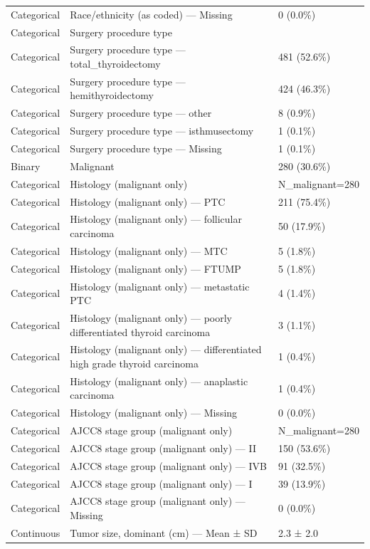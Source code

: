 \begin{table}[htbp]
\begin{tabular}{lll}
Categorical & Race/ethnicity (as coded) — Missing & 0 (0.0\%) \\
Categorical & Surgery procedure type &  \\
Categorical & Surgery procedure type — total\_thyroidectomy & 481 (52.6\%) \\
Categorical & Surgery procedure type — hemithyroidectomy & 424 (46.3\%) \\
Categorical & Surgery procedure type — other & 8 (0.9\%) \\
Categorical & Surgery procedure type — isthmusectomy & 1 (0.1\%) \\
Categorical & Surgery procedure type — Missing & 1 (0.1\%) \\
Binary & Malignant & 280 (30.6\%) \\
Categorical & Histology (malignant only) & N\_malignant=280 \\
Categorical & Histology (malignant only) — PTC & 211 (75.4\%) \\
Categorical & Histology (malignant only) — follicular carcinoma & 50 (17.9\%) \\
Categorical & Histology (malignant only) — MTC & 5 (1.8\%) \\
Categorical & Histology (malignant only) — FTUMP & 5 (1.8\%) \\
Categorical & Histology (malignant only) — metastatic PTC & 4 (1.4\%) \\
Categorical & Histology (malignant only) — poorly differentiated thyroid carcinoma & 3 (1.1\%) \\
Categorical & Histology (malignant only) — differentiated high grade thyroid carcinoma & 1 (0.4\%) \\
Categorical & Histology (malignant only) — anaplastic carcinoma & 1 (0.4\%) \\
Categorical & Histology (malignant only) — Missing & 0 (0.0\%) \\
Categorical & AJCC8 stage group (malignant only) & N\_malignant=280 \\
Categorical & AJCC8 stage group (malignant only) — II & 150 (53.6\%) \\
Categorical & AJCC8 stage group (malignant only) — IVB & 91 (32.5\%) \\
Categorical & AJCC8 stage group (malignant only) — I & 39 (13.9\%) \\
Categorical & AJCC8 stage group (malignant only) — Missing & 0 (0.0\%) \\
Continuous & Tumor size, dominant (cm) — Mean ± SD & 2.3 ± 2.0 \\

\end{tabular}
\end{table}
